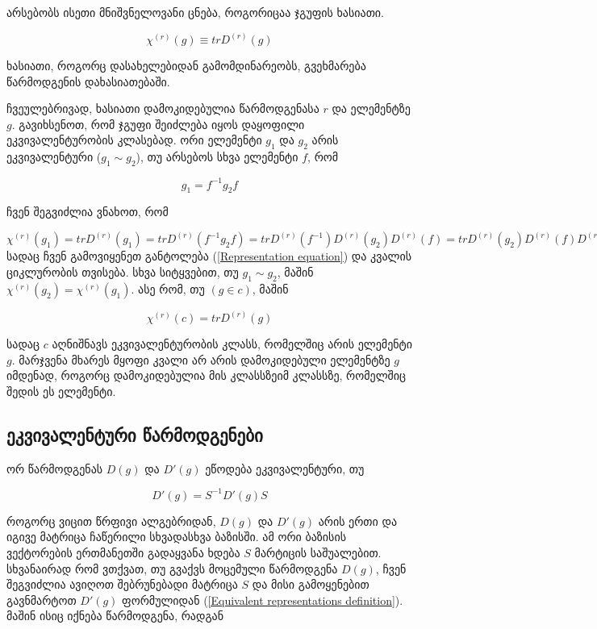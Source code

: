\documentclass[12pt]{article}
\begin{document}
\begin{sloppypar}
	არსებობს ისეთი მნიშვნელოვანი ცნება, როგორიცაა ჯგუფის ხასიათი.

\begin{equation} \label{Group character definition}
		 \chi^{(r)}(g) \equiv tr D^{(r)}(g)
\end{equation}

ხასიათი, როგორც დასახელებიდან გამომდინარეობს, გვეხმარება წარმოდგენის დახასიათებაში.

ჩვეულებრივად, ხასიათი დამოკიდებულია წარმოდგენასა $r$ და ელემენტზე $g$. გავიხსენოთ, რომ ჯგუფი შეიძლება იყოს დაყოფილი ეკვივალენტურობის კლასებად. ორი ელემენტი $g_1$ და $g_2$ არის ეკვივალენტური ($g_1 \sim g_2$), თუ არსებოს სხვა ელემენტი $f$, რომ 

\begin{equation} \label{Group equivalence definition}
		 g_1 = f^{-1}g_2f
\end{equation}

ჩვენ შეგვიძლია ვნახოთ, რომ 

$
\chi^{(r)}(g_1) = tr D^{(r)}(g_1) = tr D^{(r)}(f^{-1}g_2f) = tr D^{(r)}(f^{-1}) D^{(r)}(g_2) D^{(r)}(f) = 
tr D^{(r)}(g_2) D^{(r)}(f) D^{(r)}(f^{-1}) = tr D^{(r)}(g_2) D^{(r)}(I) = tr D^{(r)}(g_2) = \chi^{(r)}(g_2)
$
სადაც ჩვენ გამოვიყენეთ განტოლება (\ref{Representation equation}) და კვალის ციკლურობის თვისება. სხვა სიტყვებით, თუ $g_1 \sim g_2$, მაშინ $\chi^{(r)}(g_2) = \chi^{(r)}(g_1)$. ასე რომ, თუ $(g \in c)$, მაშინ

\begin{equation} \label{Trace depends on class}
	\chi^{(r)}(c) = tr D^{(r)}(g) 
\end{equation}

სადაც $c$ აღნიშნავს ეკვივალენტურობის კლასს, რომელშიც არის ელემენტი $g$. მარჯვენა მხარეს მყოფი კვალი არ არის დამოკიდებული ელემენტზე $g$ იმდენად, როგორც დამოკიდებულია მის კლასსზეიმ კლასსზე, რომელშიც შედის ეს ელემენტი.

\subsection{ეკვივალენტური წარმოდგენები}
ორ წარმოდგენას $D(g)$ და $D'(g)$ ეწოდება ეკვივალენტური, თუ 

\begin{equation} \label{Equivalent representations definition}
	D'(g) = S^{-1}D'(g)S
\end{equation}

როგორც ვიცით წრფივი ალგებრიდან, $D(g)$ და $D'(g)$ არის ერთი და იგივე მატრიცა ჩაწერილი სხვადასხვა ბაზისში. ამ ორი ბაზისის ვექტორების ერთმანეთში გადაყვანა ხდება $S$ მარტიცის საშუალებით. სხვანაირად რომ ვთქვათ, თუ გვაქვს მოცემული წარმოდგენა $D(g)$, ჩვენ შეგვიძლია ავიღოთ შებრუნებადი მატრიცა $S$ და მისი გამოყენებით გავნმარტოთ $D'(g)$ ფორმულიდან (\ref{Equivalent representations definition}). მაშინ ისიც იქნება წარმოდგენა, რადგან 


\end{sloppypar}
\end{document}
